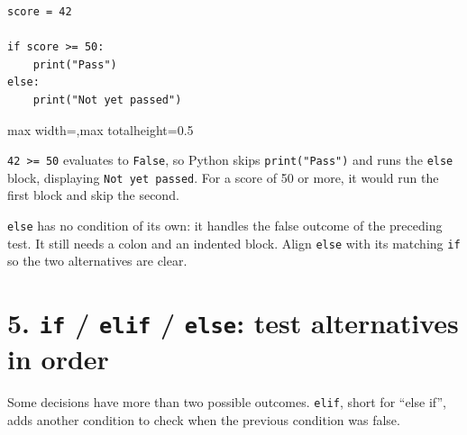 \documentclass[12pt,a4paper]{article}
\begin{document}
\begin{minipage}{\linewidth}
\begin{lstlisting}
score = 42

if score >= 50:
    print("Pass")
else:
    print("Not yet passed")
\end{lstlisting}
\end{minipage}
\par
\begin{center}
\begin{adjustbox}{max width=\linewidth,max totalheight=0.5\textheight}
\end{adjustbox}
\end{center}
\texttt{42 >= 50} evaluates to \texttt{False}, so Python skips \texttt{print("Pass")} and runs the \texttt{else} block, displaying \texttt{Not yet passed}. For a score of 50 or more, it would run the first block and skip the second.

\texttt{else} has no condition of its own: it handles the false outcome of the preceding test. It still needs a colon and an indented block. Align \texttt{else} with its matching \texttt{if} so the two alternatives are clear.

\section*{5. \texttt{if} / \texttt{elif} / \texttt{else}: test alternatives in order}
Some decisions have more than two possible outcomes. \texttt{elif}, short for “else if”, adds another condition to check when the previous condition was false.
\end{document}
